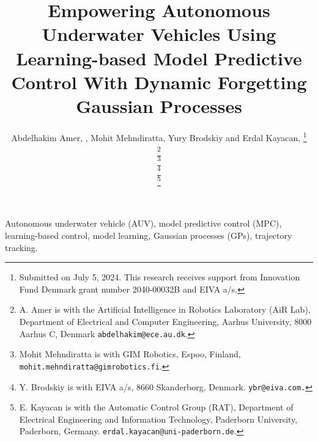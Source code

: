 \documentclass{IEEEtran}
\begin{document}
\title{ Empowering Autonomous Underwater Vehicles Using Learning-based Model Predictive Control With Dynamic Forgetting Gaussian Processes}


\author{Abdelhakim Amer, , Mohit Mehndiratta, Yury Brodskiy and Erdal Kayacan, 
\thanks{Submitted on July 5, 2024. This research receives support from Innovation Fund Denmark grant number 2040-00032B and EIVA a/s.}

\thanks{A. Amer is with the Artificial Intelligence in Robotics Laboratory (AiR Lab), Department of Electrical and Computer Engineering, Aarhus University, 8000 Aarhus C, Denmark {\tt\small abdelhakim@ece.au.dk}.}

\thanks{Mohit Mehndiratta is with GIM Robotics, Espoo, Finland, {\tt\small mohit.mehndiratta@gimrobotics.fi}.}


 \thanks{    Y. Brodskiy is with EIVA a/s, 8660 Skanderborg, Denmark. {\tt\small ybr@eiva.com.}}   
 
 \thanks{E. Kayacan is with the Automatic Control Group (RAT), Department of Electrical Engineering and Information Technology, Paderborn University, Paderborn, Germany. {\tt\small erdal.kayacan@uni-paderborn.de}.}%
}

\maketitle
\begin{abstract}


\end{abstract}
\IEEEpeerreviewmaketitle

\begin{IEEEkeywords}
Autonomous underwater vehicle (AUV), model
predictive control (MPC), learning-based control, model learning, Gaussian processes (GPs), trajectory tracking.
\end{IEEEkeywords}








\end{document}
